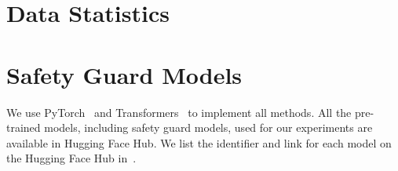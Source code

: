 \section{Data Statistics}
\label{sec:data_statistics}

\begin{table}[ht]
    \centering
    \caption{Statistics of each dataset.}
    \label{tab:data-stat}
\end{table}

\section{Safety Guard Models}
\label{sec:model}
We use PyTorch~\citep{pytorch} and Transformers~\citep{transformers} to implement all methods. All the pre-trained models, including safety guard models, used for our experiments are available in Hugging Face Hub. We list the identifier and link for each model on the Hugging Face Hub in~.

